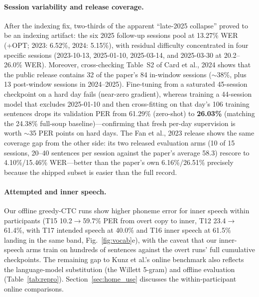 \documentclass[11pt]{article}
\begin{document}
\paragraph{Session variability and release coverage.} After the
indexing fix, two-thirds of the apparent ``late-2025 collapse'' proved
to be an indexing artifact: the six 2025 follow-up sessions pool at
13.27\% WER (+OPT; 2023: 6.52\%, 2024: 5.15\%), with residual difficulty
concentrated in four specific sessions (2023-10-13, 2025-01-10,
2025-03-14, and 2025-03-30 at 20.2--26.0\% WER). Moreover, cross-checking
Table~S2 of Card et al., 2024 shows that the public release contains 32
of the paper's 84 in-window sessions ($\sim$38\%, plus 13 post-window
sessions in 2024--2025). Fine-tuning from a saturated 45-session
checkpoint on a hard day fails (near-zero gradient), whereas training a
44-session model that excludes 2025-01-10 and then cross-fitting on that
day's 106 training sentences drops its validation PER from 61.29\%
(zero-shot) to \textbf{26.03\%} (matching the 24.38\% full-soup baseline)---confirming
that fresh per-day supervision is worth $\sim$35 PER points on hard days.
The Fan et al., 2023 release shows the same coverage gap from the other
side: its two released evaluation arms (10 of 15 sessions, 20--40
sentences per session against the paper's average 58.3) rescore to
4.10\%/15.46\% WER---better than the paper's own 6.16\%/26.51\% precisely
because the shipped subset is easier than the full record.

\paragraph{Attempted and inner speech.} Our offline greedy-CTC runs
show higher phoneme error for inner speech within participants (T15
10.2$\to$59.7\% PER from overt copy to inner, T12 23.4$\to$61.4\%,
with T17 intended speech at 40.0\% and T16 inner speech at 61.5\%
landing in the same band, Fig.~\ref{fig:vocab}e), with the caveat
that our inner-speech arms train on hundreds of sentences against the
overt runs' full cumulative checkpoints. The remaining gap to
Kunz et al.'s online benchmark also reflects the language-model
substitution (the Willett 5-gram) and offline evaluation
(Table~\ref{tab:repro}). Section~\ref{sec:home_use} discusses the
within-participant online comparisons.
\end{document}
